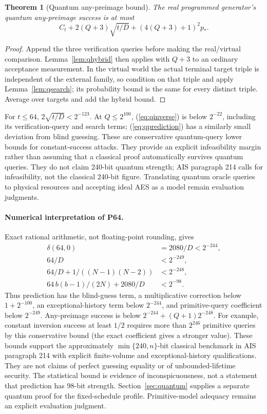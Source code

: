 \documentclass[11 pt,a 4 paper]{article}
\newtheorem{theorem}{Theorem}
\begin{document}
\begin{theorem}[Quantum any-preimage bound]\label{thm:qinverse}
The real programmed generator's quantum any-preimage success is at most
\begin{equation}
 C_t+2(Q+3)\sqrt{t/D}+(4(Q+3)+1)^2 p_* .\label{eq:qinverse}
\end{equation}
\end{theorem}
\begin{proof}
Append the three verification queries before making the real/virtual comparison. Lemma~\ref{lem:qhybrid} then applies with $ Q+3$ to an ordinary acceptance measurement. In the virtual world the actual terminal target triple is independent of the external family, so condition on that triple and apply Lemma~\ref{lem:qsearch}; its probability bound is the same for every distinct triple. Average over targets and add the hybrid bound.
\end{proof}

For $ t\leq 64$, $2\sqrt{t/D}<2^{-123}$. At $ Q\leq 2^{100}$, (\ref{eq:qinverse}) is below $2^{-22}$, including its verification-query and search terms; (\ref{eq:qprediction}) has a similarly small deviation from blind guessing. These are conservative quantum-query lower bounds for constant-success attacks. They provide an explicit infeasibility margin rather than assuming that a classical proof automatically survives quantum queries. They do not claim 240-bit quantum strength; AIS paragraph 214 calls for infeasibility, not the classical 240-bit figure. Translating quantum oracle queries to physical resources and accepting ideal AES as a model remain evaluation judgments.

\paragraph{Numerical interpretation of P64.} Exact rational arithmetic, not floating-point rounding, gives
\begin{align}
 \delta(64,0)&=2080/D<2^{-244},\label{eq:num-collision}\\
 64/D&<2^{-249},\label{eq:num-query}\\
 64/D+1/((N-1)(N-2))&<2^{-248},\label{eq:num-inverse}\\
 64\,b(b-1)/(2 N)+2080/D&<2^{-98}.\label{eq:num-stat}
\end{align}
Thus prediction has the blind-guess term, a multiplicative correction below $1+2^{-100}$, an exceptional-history term below $2^{-244}$, and primitive-query coefficient below $2^{-249}$. Any-preimage success is below $2^{-244}+(Q+1)2^{-248}$. For example, constant inversion success at least $1/2$ requires more than $2^{246}$ primitive queries by this conservative bound (the exact coefficient gives a stronger value). These bounds support the approximately $\min\{240,n\}$-bit classical benchmark in AIS paragraph 214 with explicit finite-volume and exceptional-history qualifications. They are not claims of perfect guessing equality or of unbounded-lifetime security. The statistical bound is evidence of inconspicuousness, not a statement that prediction has 98-bit strength. Section~\ref{sec:quantum} supplies a separate quantum proof for the fixed-schedule profile. Primitive-model adequacy remains an explicit evaluation judgment.
\end{document}
